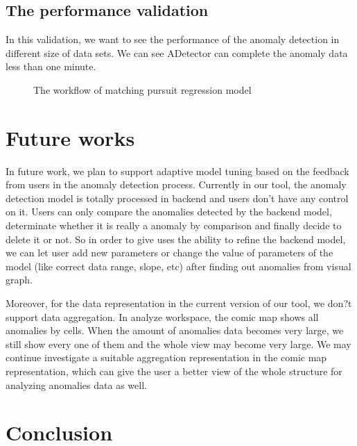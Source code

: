 \documentclass{vgtc}                          %
\begin{document}
\subsection{The performance validation}
In this validation, we want to see the performance of the anomaly detection in different size of data sets. We can see ADetector can complete the anomaly data less than one minute. 

\begin{figure}[htb]
\begin{center}
\end{center}
	\caption{The workflow of matching pursuit regression model}
\end{figure} 

\section{Future works}

In future work, we plan to support adaptive model tuning based on the feedback from users in the anomaly detection process. Currently in our tool, the anomaly detection model is totally processed in backend and users don’t have any control on it. Users can only compare the anomalies detected by the backend model, determinate whether it is really a anomaly by comparison and finally decide to delete it or not. So in order to give uses the ability to refine the backend model, we can let user add new parameters or change the value of parameters of the model (like correct data range, slope, etc) after finding out anomalies from visual graph.

      Moreover, for the data representation in the current version of our tool, we don?t support data aggregation. In analyze workspace, the comic map shows all anomalies by cells. When the amount of anomalies data becomes very large, we still show every one of them and the whole view may become very large. We may continue investigate a suitable aggregation representation in the comic map representation, which can give the user a better view of the whole structure for analyzing anomalies data as well.  
\section{Conclusion}
\end{document}
